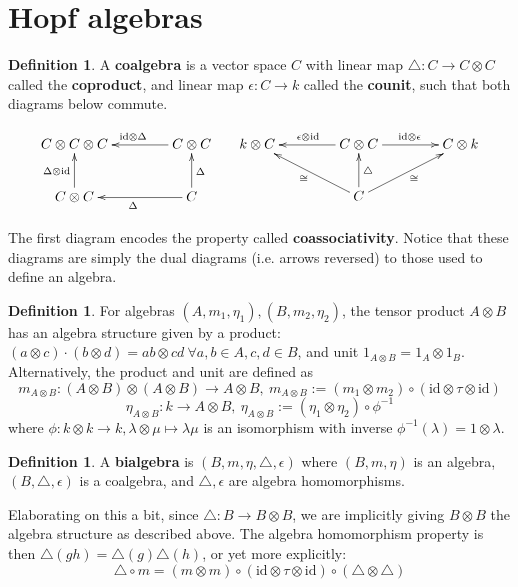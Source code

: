 \documentclass[11pt]{article}
\newcommand{\bb}{\medbreak}
\newcommand{\nt}{\noindent}
\newcommand{\rt}{\xrightarrow{}}
\newcommand{\cd}{\cdot}
\newcommand{\id}{\text{id}}
\newcommand{\define}[1]{\textbf{#1}}
\theoremstyle{definition}
\newtheorem{definition}[lemma]{Definition}
\begin{document}
\section{Hopf algebras}

\begin{definition} A \define{coalgebra} is a vector space $C$ with linear map $\triangle:C \rt C \otimes C$ called the \define{coproduct}, and linear map $\epsilon: C \rt k$ called the \define{counit}, such that both diagrams below commute. 
\begin{useimager}
$$\xymatrix@C=4em{
C \otimes C \otimes C & C \otimes C \ar[l]_{\id \otimes \Delta}\\
C \otimes C \ar[u]^{\Delta \otimes \id} & C \ar[l]^{\Delta} \ar[u]_{\Delta}
}\hspace{.5cm}
\xymatrix@C=4em{
k \otimes C & C \otimes C \ar[l]_{\epsilon \otimes \id} \ar[r]^{\id \otimes \epsilon} & C \otimes k\\
 & C \ar[u]_\triangle \ar[ru]_\cong \ar[ul]^\cong
}
$$
\end{useimager}
\nt The first diagram encodes the property called \define{coassociativity}. Notice that these diagrams are simply the dual diagrams (i.e. arrows reversed) to those used to define an algebra. 
\end{definition}


\begin{definition}\label{tens_algebras} For algebras $(A,m_1,\eta_1),(B,m_2,\eta_2)$, the tensor product $A\otimes B$ has an algebra structure given by a product: $(a \otimes c)\cd (b \otimes d) = ab \otimes cd\ \forall a,b\in A,c,d\in B$, and unit $1_{A\otimes B}=1_A\otimes 1_B$. Alternatively, the product and unit are defined as 
$$m_{A\otimes B}: (A\otimes B) \otimes (A\otimes B)\rt A\otimes B,\ m_{A\otimes B}:=(m_1\otimes m_2)\circ (\id \otimes \tau \otimes \id)$$ 
$$\eta_{A\otimes B}:k\rt A\otimes B,\ \eta_{A\otimes B}:=(\eta_1 \otimes \eta_2)\circ \phi^{-1}$$
where $\phi:k\otimes k\rt k,\lambda\otimes \mu \mapsto \lambda\mu$ is an isomorphism with inverse $\phi^{-1}(\lambda)=1\otimes \lambda$.
\end{definition}

\begin{definition} A \define{bialgebra} is $(B,m,\eta,\triangle,\epsilon)$ where $(B,m,\eta)$ is an algebra, $(B,\triangle,\epsilon)$ is a coalgebra, and $\triangle,\epsilon$ are algebra homomorphisms.\bb
  
\nt Elaborating on this a bit, since $\triangle:B\rt B\otimes B$, we are implicitly giving $B\otimes B$ the algebra structure as described above. The algebra homomorphism property is then $\triangle (gh) = \triangle(g)\triangle(h)$, or yet more explicitly: 
$$\triangle \circ m = (m\otimes m) \circ (\id \otimes \tau \otimes \id) \circ (\triangle \otimes \triangle)$$
\end{definition}
\end{document}
